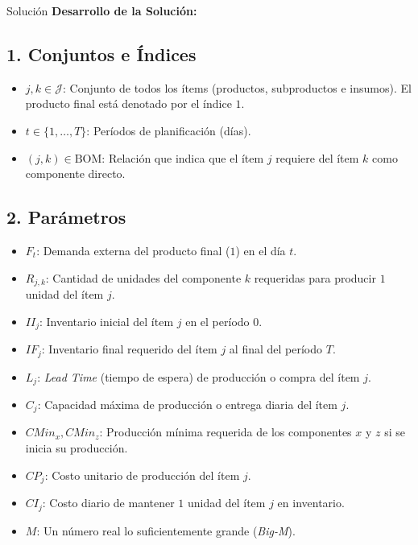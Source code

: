 \documentclass[11pt, a4paper]{article}
\begin{document}
  \medskip
  \begin{ejercicio}{Solución}
  \textbf{Desarrollo de la Solución:}

  \subsection*{1. Conjuntos e Índices}
  \begin{itemize}
    \item $j, k \in \mathcal{J}$: Conjunto de todos los ítems (productos, subproductos e insumos). El producto final está denotado por el índice $1$.
    \item $t \in \{1, \dots, T\}$: Períodos de planificación (días).
    \item $(j, k) \in \text{BOM}$: Relación que indica que el ítem $j$ requiere del ítem $k$ como componente directo.
  \end{itemize}

  \subsection*{2. Parámetros}
  \begin{itemize}
    \item $F_t$: Demanda externa del producto final ($1$) en el día $t$.
    \item $R_{j,k}$: Cantidad de unidades del componente $k$ requeridas para producir $1$ unidad del ítem $j$.
    \item $II_j$: Inventario inicial del ítem $j$ en el período $0$.
    \item $IF_j$: Inventario final requerido del ítem $j$ al final del período $T$.
    \item $L_j$: \textit{Lead Time} (tiempo de espera) de producción o compra del ítem $j$.
    \item $C_j$: Capacidad máxima de producción o entrega diaria del ítem $j$.
    \item $CMin_x, CMin_z$: Producción mínima requerida de los componentes $x$ y $z$ si se inicia su producción.
    \item $CP_j$: Costo unitario de producción del ítem $j$.
    \item $CI_j$: Costo diario de mantener $1$ unidad del ítem $j$ en inventario.
    \item $M$: Un número real lo suficientemente grande (\textit{Big-M}).
  \end{itemize}


\end{ejercicio}
\end{document}
